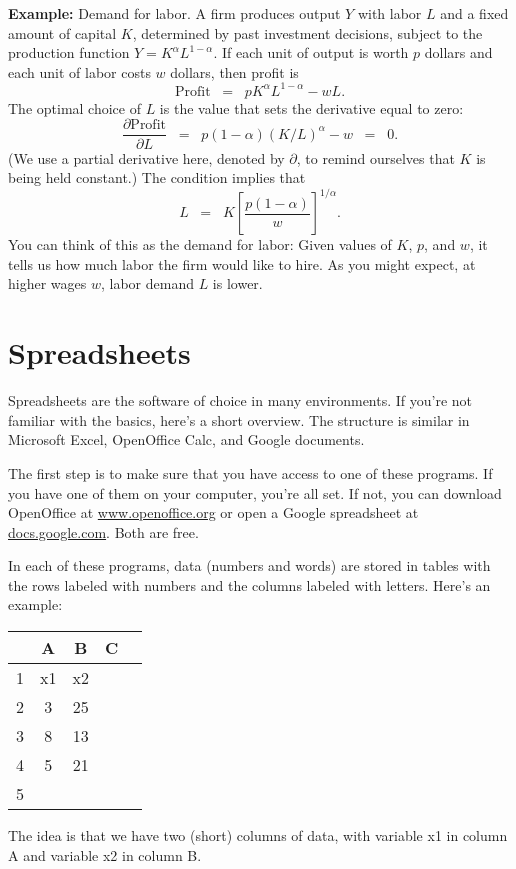 \textbf{Example:}  Demand for labor.
A firm produces output $Y$ with labor $L$ and a fixed amount of capital $K$,
determined by past investment decisions,
subject to the production function $ Y = K^\alpha L^{1-\alpha} $.
If each unit of output is worth $p$ dollars and each unit of labor costs $w$ dollars,
then profit is
\[
    \mbox{Profit} \;\;=\;\; p K^\alpha L^{1-\alpha} - w L .
\]
The optimal choice of $L$ is the value that sets the derivative equal to zero:
\[
    \frac{\partial \mbox{Profit}}{\partial L} \;\;=\;\;  p (1-\alpha) (K/L)^\alpha - w \;\;=\;\; 0 .
\]
(We use a partial derivative here, denoted by $\partial$, to remind ourselves that $K$ is being held constant.)
The condition implies that
\[
    L \;\;=\;\; K \left[ \frac{p (1-\alpha)}{w} \right]^{1/\alpha} .
\]
You can think of this as the demand for labor:
Given values of $K$, $p$, and $w$, it tells us how much labor the firm would like to hire.
As you might expect, at higher wages $w$, labor demand $L$ is lower.


\section{Spreadsheets}

Spreadsheets 
 are the software of choice in many environments.
If you're not familiar with the basics, here's a short overview.
The structure is similar in
Microsoft Excel, OpenOffice Calc, and Google documents.

The first step is to make sure that you have access to one of these programs.
If you have one of them on your computer, you're all set.
If not, you can download OpenOffice at
\url{www.openoffice.org} or open a Google spreadsheet
at \url{docs.google.com}.
Both are free.

In each of these programs,
data (numbers and words) are stored in tables
with the rows labeled with numbers
and the columns labeled with letters.
Here's an example:
%
\begin{center}
\begin{tabular}{c|cccc}
    &  A  &  B   &  C  \\
\midrule
1   &  x1 &  x2        \\
2   &  3  &  25        \\
3   &  8  &  13        \\
4   &  5  &  21        \\
5    %
\end{tabular}
\end{center}
%
The idea is that we have two (short) columns of data,
with variable x1 in column A and variable x2 in column B.


